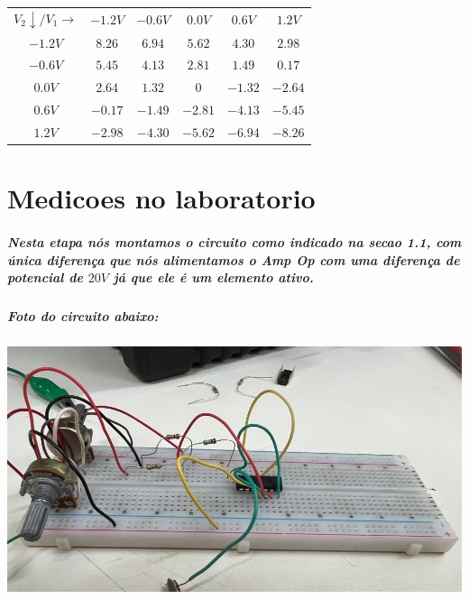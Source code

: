 \documentclass[12pt,twoside, a4paper, twocolumn]{article}
\begin{document}
\begin{center}
    \begin{tabular}{ |c|ccccc| }
        \hline
        $V_2 \downarrow / V_1 \rightarrow $ & $-1.2V$ & $-0.6V$ & $0.0V$  & $0.6V$  & $1.2V$  \\
        $-1.2V$                             & $8.26$  & $6.94$  & $5.62$  & $4.30$  & $2.98$  \\
        $ -0.6V$                            & $5.45$  & $4.13$  & $2.81$  & $1.49$  & $0.17$  \\
        $0.0V$                              & $2.64$  & $1.32$  & $0$     & $-1.32$ & $-2.64$ \\
        $ 0.6V$                             & $-0.17$ & $-1.49$ & $-2.81$ & $-4.13$ & $-5.45$ \\
        $ 1.2V$                             & $-2.98$ & $-4.30$ & $-5.62$ & $-6.94$ & $-8.26$ \\
        \hline
    \end{tabular}
\end{center}

\section{Medicoes no laboratorio}

\subparagraph*{Nesta etapa nós montamos o circuito como indicado na secao 1.1, com única diferença que nós alimentamos o Amp Op com uma diferença de potencial de $20V$ já que ele é um elemento ativo.}

\subparagraph*{Foto do circuito abaixo:}
\subparagraph*{}

\begin{adjustbox}{scale=0.3}
    \includegraphics{circuito.png}
\end{adjustbox}
\end{document}
